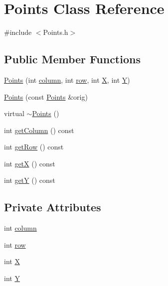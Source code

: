 \hypertarget{classPoints}{
\section{Points Class Reference}
\label{classPoints}
}


{\ttfamily \#include $<$Points.h$>$}\subsection*{Public Member Functions}
\begin{DoxyCompactItemize}
\item 
\hyperlink{classPoints_aeaf6778964752a6ed2e00df462c4a439}{Points} (int \hyperlink{classPoints_a8e0c88423dde84bd39edea1e5d59d5c9}{column}, int \hyperlink{classPoints_a623ad517502bf64f0e7a19d68387fe99}{row}, int \hyperlink{classPoints_a7d7b56ddf7b70ee5294682a906cbe2f6}{X}, int \hyperlink{classPoints_acdf2dd50360f247d9862b23afbad3d56}{Y})
\item 
\hyperlink{classPoints_ab240074a27bcb6823ac99a1b81213545}{Points} (const \hyperlink{classPoints}{Points} \&orig)
\item 
virtual \hyperlink{classPoints_a9d56d7dc8b6a6f492e07d354eb379c12}{$\sim$Points} ()
\item 
int \hyperlink{classPoints_aa55ab8e763830977bf1754ec4eed4a04}{getColumn} () const 
\item 
int \hyperlink{classPoints_ab02d1378e304aa93a8295d91760edfd5}{getRow} () const 
\item 
int \hyperlink{classPoints_a1e456e00d343c7e514d3d3560ba64d87}{getX} () const 
\item 
int \hyperlink{classPoints_aadcbf3fa0d8833e9465138e368ba8498}{getY} () const 
\end{DoxyCompactItemize}
\subsection*{Private Attributes}
\begin{DoxyCompactItemize}
\item 
int \hyperlink{classPoints_a8e0c88423dde84bd39edea1e5d59d5c9}{column}
\item 
int \hyperlink{classPoints_a623ad517502bf64f0e7a19d68387fe99}{row}
\item 
int \hyperlink{classPoints_a7d7b56ddf7b70ee5294682a906cbe2f6}{X}
\item 
int \hyperlink{classPoints_acdf2dd50360f247d9862b23afbad3d56}{Y}
\end{DoxyCompactItemize}


